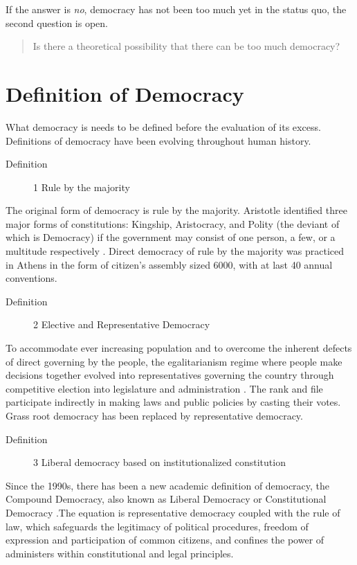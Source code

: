 \documentclass{scrartcl}
\begin{document}
If the answer is \emph{no}, democracy has not been too much yet in the status quo, the second question is open.

\begin{quote}
Is there a theoretical possibility that there can be too much democracy? 
\end{quote}

\section{Definition of Democracy}

What democracy is needs to be defined before the evaluation of its
excess. Definitions of democracy have been evolving throughout human
history. 
\begin{description}
\item [{Definition}] 1 Rule by the majority
\end{description}
The original form of democracy is rule by the majority. Aristotle
identified three major forms of constitutions: Kingship, Aristocracy,
and Polity (the deviant of which is Democracy) if the government may
consist of one person, a few, or a multitude respectively \autocite{arispol}.
Direct democracy of rule by the majority was practiced in Athens in
the form of citizen's assembly sized 6000, with at last 40 annual
conventions. 
\begin{description}
\item [{Definition}] 2 Elective and Representative Democracy
\end{description}
To accommodate ever increasing population and to overcome the inherent
defects of direct governing by the people, the egalitarianism regime
where people make decisions together evolved into representatives
governing the country through competitive election into legislature
and administration \autocite{capsocdem}. The rank and file participate
indirectly in making laws and public policies by casting their votes.
Grass root democracy has been replaced by representative democracy. 
\begin{description}
\item [{Definition}] 3 Liberal democracy based on institutionalized constitution
\end{description}
Since the 1990s, there has been a new academic definition of democracy,
the Compound Democracy, also known as Liberal Democracy or Constitutional
Democracy \autocite{Bao2018}.The equation is representative democracy
coupled with the rule of law, which safeguards the legitimacy of political
procedures, freedom of expression and participation of common citizens,
and confines the power of administers within constitutional and legal
principles. 
\end{document}
